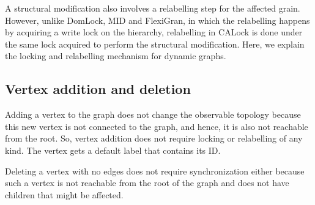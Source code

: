 

A structural modification also involves a relabelling step for the affected grain. However, unlike DomLock, MID and FlexiGran, in which the relabelling happens by acquiring a write lock on the hierarchy, relabelling in CALock is done under the same lock acquired to perform the structural modification. 
Here, we explain the locking and relabelling mechanism for dynamic graphs.

\subsection{Vertex addition and deletion}
Adding a vertex to the graph does not change the observable topology because this new vertex is not connected to the graph, and hence, it is also not reachable from the root. 
So, vertex addition does not require locking or relabelling of any kind. The vertex gets a default label that contains its ID. 

Deleting a vertex with no edges does not require synchronization either because such a vertex is not reachable from the root of the graph and does not have children that might be affected.

